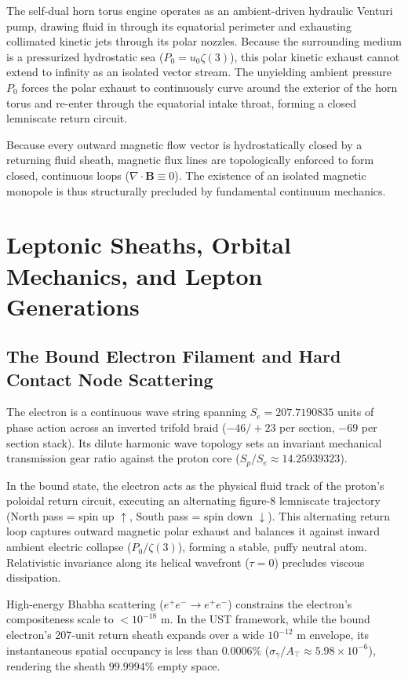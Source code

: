 \documentclass[11pt,a4paper]{article}
\begin{document}
	The self-dual horn torus engine operates as an ambient-driven hydraulic Venturi pump, drawing fluid in through its equatorial perimeter and exhausting collimated kinetic jets through its polar nozzles. Because the surrounding medium is a pressurized hydrostatic sea ($P_0 = u_0 \zeta(3)$), this polar kinetic exhaust cannot extend to infinity as an isolated vector stream. The unyielding ambient pressure $P_0$ forces the polar exhaust to continuously curve around the exterior of the horn torus and re-enter through the equatorial intake throat, forming a closed lemniscate return circuit.
	
	Because every outward magnetic flow vector is hydrostatically closed by a returning fluid sheath, magnetic flux lines are topologically enforced to form closed, continuous loops ($\nabla \cdot \mathbf{B} \equiv 0$). The existence of an isolated magnetic monopole is thus structurally precluded by fundamental continuum mechanics.
	
	\section{Leptonic Sheaths, Orbital Mechanics, and Lepton Generations}
	
	\subsection{The Bound Electron Filament and Hard Contact Node Scattering}
	The electron is a continuous wave string spanning $S_e = 207.7190835$ units of phase action across an inverted trifold braid ($-46/+23$ per section, $-69$ per section stack). Its dilute harmonic wave topology sets an invariant mechanical transmission gear ratio against the proton core ($S_p / S_e \approx 14.25939323$).
	
	In the bound state, the electron acts as the physical fluid track of the proton's poloidal return circuit, executing an alternating figure-8 lemniscate trajectory (North pass = spin up $\uparrow$, South pass = spin down $\downarrow$). This alternating return loop captures outward magnetic polar exhaust and balances it against inward ambient electric collapse ($P_0 / \zeta(3)$), forming a stable, puffy neutral atom. Relativistic invariance along its helical wavefront ($\tau = 0$) precludes viscous dissipation.
	
	High-energy Bhabha scattering ($e^+e^- \to e^+e^-$) constrains the electron's compositeness scale to $< 10^{-18}\text{ m}$. In the UST framework, while the bound electron's 207-unit return sheath expands over a wide $10^{-12}\text{ m}$ envelope, its instantaneous spatial occupancy is less than $0.0006\%$ ($\sigma_\gamma / A_{\top} \approx 5.98 \times 10^{-6}$), rendering the sheath $99.9994\%$ empty space.
	
\end{document}
